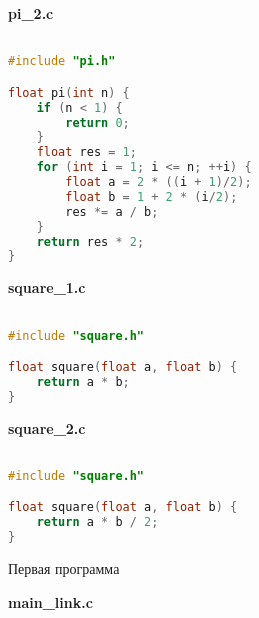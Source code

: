 \textbf{pi\_2.c}

\begin{lstlisting}[language=C]

#include "pi.h"

float pi(int n) {
    if (n < 1) {
        return 0;
    }
    float res = 1;
    for (int i = 1; i <= n; ++i) {
        float a = 2 * ((i + 1)/2);
        float b = 1 + 2 * (i/2);
        res *= a / b;
    }
    return res * 2;
}

\end{lstlisting}

\textbf{square\_1.c}

\begin{lstlisting}[language=C]

#include "square.h"

float square(float a, float b) {
    return a * b;
}

\end{lstlisting}

\pagebreak

\textbf{square\_2.c}

\begin{lstlisting}[language=C]

#include "square.h"

float square(float a, float b) {
    return a * b / 2;
}

\end{lstlisting}

{\large Первая программа}

\textbf{main\_link.c}

